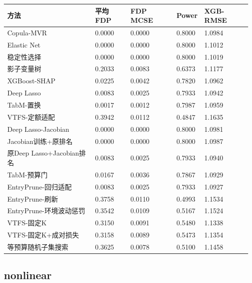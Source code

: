 \documentclass[UTF8,11pt,a4paper]{ctexart}
\begin{document}
{\def\LTcaptype{none} %
{
\footnotesize
\begin{longtable}[]{@{}lllll@{}}
\toprule\noalign{}
方法 & 平均FDP & FDP MCSE & Power & XGB-RMSE \\
\midrule\noalign{}
\endhead
\bottomrule\noalign{}
\endlastfoot
Copula-MVR & 0.0000 & 0.0000 & 0.8000 & 1.0984 \\
Elastic Net & 0.0000 & 0.0000 & 0.8000 & 1.1012 \\
稳定性选择 & 0.0000 & 0.0000 & 0.8000 & 1.1019 \\
影子变量树 & 0.2033 & 0.0083 & 0.6373 & 1.1177 \\
XGBoost-SHAP & 0.0225 & 0.0042 & 0.7820 & 1.0962 \\
Deep Lasso & 0.0083 & 0.0025 & 0.7933 & 1.0942 \\
TabM-置换 & 0.0017 & 0.0012 & 0.7987 & 1.0959 \\
VTFS-定额适配 & 0.3942 & 0.0112 & 0.4847 & 1.1635 \\
Deep Lasso-Jacobian & 0.0000 & 0.0000 & 0.8000 & 1.0981 \\
Jacobian训练+原排名 & 0.0000 & 0.0000 & 0.8000 & 1.0987 \\
原Deep Lasso+Jacobian排名 & 0.0083 & 0.0025 & 0.7933 & 1.0940 \\
TabM-预算门 & 0.0167 & 0.0036 & 0.7867 & 1.0929 \\
EntryPrune-回归适配 & 0.0083 & 0.0025 & 0.7933 & 1.0927 \\
EntryPrune-刷新 & 0.3758 & 0.0110 & 0.4993 & 1.1534 \\
EntryPrune-环境波动惩罚 & 0.3542 & 0.0109 & 0.5167 & 1.1524 \\
VTFS-固定K & 0.3150 & 0.0091 & 0.5480 & 1.1338 \\
VTFS-固定K+成对损失 & 0.3158 & 0.0089 & 0.5473 & 1.1354 \\
等预算随机子集搜索 & 0.3625 & 0.0078 & 0.5100 & 1.1458 \\
\end{longtable}
}
}

\subsection{nonlinear}\label{nonlinear}
\end{document}
